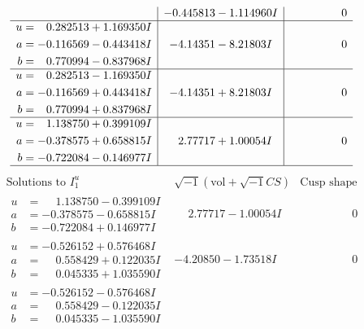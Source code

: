 \documentclass[1p]{elsarticle_modified}
\theoremstyle{definition}
\newcommand{\I}{\sqrt{-1}}
\begin{document}
$$\begin{array}{c|c|c}
 & -0.445813 - 1.114960 I & \phantom{-0.000000 } 0 \\ \hline\begin{aligned}
u &= \phantom{-}0.282513 + 1.169350 I \\
a &= -0.116569 - 0.443418 I \\
b &= \phantom{-}0.770994 - 0.837968 I\end{aligned}
 & -4.14351 - 8.21803 I & \phantom{-0.000000 } 0 \\ \hline\begin{aligned}
u &= \phantom{-}0.282513 - 1.169350 I \\
a &= -0.116569 + 0.443418 I \\
b &= \phantom{-}0.770994 + 0.837968 I\end{aligned}
 & -4.14351 + 8.21803 I & \phantom{-0.000000 } 0 \\ \hline\begin{aligned}
u &= \phantom{-}1.138750 + 0.399109 I \\
a &= -0.378575 + 0.658815 I \\
b &= -0.722084 - 0.146977 I\end{aligned}
 & \phantom{-}2.77717 + 1.00054 I & \phantom{-0.000000 } 0\\
 \hline 
 \end{array}$$\newpage$$\begin{array}{c|c|c}  
\text{Solutions to }I^u_{1}& \I (\text{vol} + \sqrt{-1}CS) & \text{Cusp shape}\\
 \hline 
\begin{aligned}
u &= \phantom{-}1.138750 - 0.399109 I \\
a &= -0.378575 - 0.658815 I \\
b &= -0.722084 + 0.146977 I\end{aligned}
 & \phantom{-}2.77717 - 1.00054 I & \phantom{-0.000000 } 0 \\ \hline\begin{aligned}
u &= -0.526152 + 0.576468 I \\
a &= \phantom{-}0.558429 + 0.122035 I \\
b &= \phantom{-}0.045335 + 1.035590 I\end{aligned}
 & -4.20850 - 1.73518 I & \phantom{-0.000000 } 0 \\ \hline\begin{aligned}
u &= -0.526152 - 0.576468 I \\
a &= \phantom{-}0.558429 - 0.122035 I \\
b &= \phantom{-}0.045335 - 1.035590 I\end{aligned}

\end{array}$$
\end{document}
